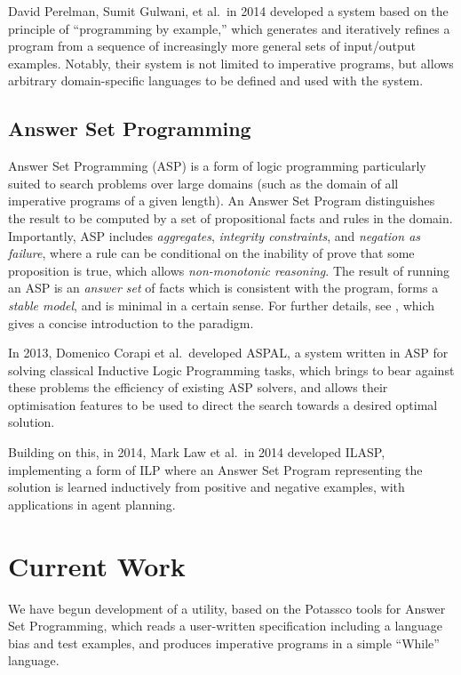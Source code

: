 \documentclass[a4paper,twoside,notitlepage]{article}
\begin{document}
David Perelman, Sumit Gulwani, et al.\ in 2014 developed a system\cite{tds} 
based on the principle of ``programming by example,'' which generates and 
iteratively refines a program from a sequence of increasingly more general 
sets of input/output examples. Notably, their system is not limited to 
imperative programs, but allows arbitrary domain-specific languages to be 
defined and used with the system.

\subsection{Answer Set Programming} \label{sec:asp}

Answer Set Programming (ASP) is a form of logic programming particularly 
suited to search problems over large domains (such as the domain of all 
imperative programs of a given length). An Answer Set Program distinguishes 
the result to be computed by a set of propositional facts and rules in the 
domain. Importantly, ASP includes \emph{aggregates}, \emph{integrity 
constraints}, and \emph{negation as failure}, where a rule can be conditional 
on the inability of prove that some proposition is true, which allows 
\emph{non-monotonic reasoning}. The result of running an ASP is an 
\emph{answer set} of facts which is consistent with the program, forms a 
\emph{stable model}, and is minimal in a certain sense. For further details, 
see \cite{glimpse}, which gives a concise introduction to the paradigm.

In 2013, Domenico Corapi et al.\ developed ASPAL\cite{aspal}, a system written 
in ASP for solving classical Inductive Logic Programming tasks, which brings 
to bear against these problems the efficiency of existing ASP solvers, and 
allows their optimisation features to be used to direct the search towards a 
desired optimal solution.

Building on this, in 2014, Mark Law et al.\ in 2014 developed 
ILASP\cite{ilasp}, implementing a form of ILP where an Answer Set Program 
representing the solution is learned inductively from positive and negative 
examples, with applications in agent planning.

\section{Current Work}

We have begun development of a utility, based on the Potassco\cite{potassco} 
tools for Answer Set Programming, which reads a user-written specification 
including a language bias and test examples, and produces imperative programs 
in a simple ``While'' language.
\end{document}
